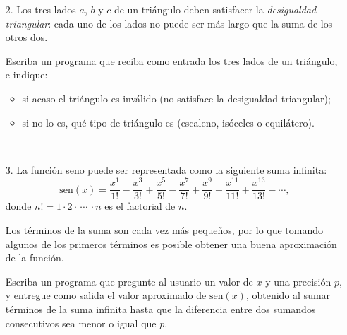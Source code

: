 \documentclass[11pt,spanish]{article}
\begin{document}
\begin{enumerate}[font=\Large\bfseries]
    \newpage
    \item[2.]
      Los tres lados \(a\), \(b\) y \(c\) de un triángulo
      deben satisfacer la \emph{desigualdad triangular}:
      cada uno de los lados no puede ser más
      largo que la suma de los otros dos.

      Escriba un programa que reciba como entrada
      los tres lados de un triángulo, e indique:
      \begin{itemize}
        \item si acaso el triángulo es inválido
          (no satisface la desigualdad triangular);
        \item si no lo es, qué tipo de triángulo es
          (escaleno, isóceles o equilátero).
      \end{itemize}

      \begin{minipage}[t]{.40\textwidth}
        
      \end{minipage}
      \hfil
      \begin{minipage}[t]{.40\textwidth}
        
      \end{minipage}
      \\
      \begin{minipage}[t]{.40\textwidth}
        
      \end{minipage}
      \hfil
      \begin{minipage}[t]{.40\textwidth}
        
      \end{minipage}

    \newpage
    \item[3.]
      La función seno puede ser representada
      como la siguiente suma infinita:
      \[
        \text{sen}(x) =
          \frac{x^{ 1}}{{ 1}!} -
          \frac{x^{ 3}}{{ 3}!} +
          \frac{x^{ 5}}{{ 5}!} -
          \frac{x^{ 7}}{{ 7}!} +
          \frac{x^{ 9}}{{ 9}!} -
          \frac{x^{11}}{{11}!} +
          \frac{x^{13}}{{13}!} -
          \cdots,
      \]
      donde \(n! = 1\cdot 2\cdot\,\cdots\,\cdot n\)
      es el factorial de \(n\).

      Los términos de la suma son cada vez más pequeños,
      por lo que tomando algunos de los primeros términos
      es posible obtener una buena aproximación de la función.

      Escriba un programa que pregunte al usuario
      un valor de \(x\) y una precisión \(p\),
      y entregue como salida el valor aproximado de \(\text{sen}(x)\),
      obtenido al sumar términos de la suma infinita
      hasta que la diferencia entre dos sumandos consecutivos
      sea menor o igual que \(p\).


\end{enumerate}
\end{document}
